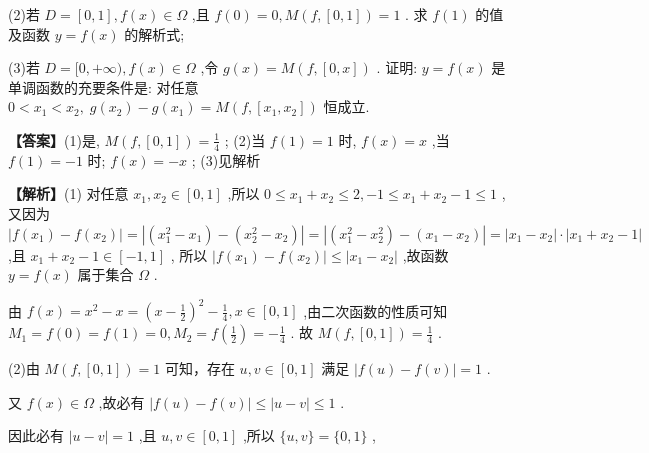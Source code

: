 \documentclass[10pt]{article}
\begin{document}
(2)若 \(D = \left\lbrack  {0,1}\right\rbrack  ,f\left( x\right)  \in  \Omega\) ,且 \(f\left( 0\right)  = 0,M\left( {f,\left\lbrack  {0,1}\right\rbrack  }\right)  = 1\) . 求 \(f\left( 1\right)\) 的值及函数 \(y = f\left( x\right)\) 的解析式;

(3)若 \(D = \lbrack 0, + \infty ),f\left( x\right)  \in  \Omega\) ,令 \(g\left( x\right)  = M\left( {f,\left\lbrack  {0,x}\right\rbrack  }\right)\) . 证明: \(y = f\left( x\right)\) 是单调函数的充要条件是: 对任意 \(0 < {x}_{1} < {x}_{2},\;g\left( {x}_{2}\right)  - g\left( {x}_{1}\right)  = M\left( {f,\left\lbrack  {{x}_{1},{x}_{2}}\right\rbrack  }\right)\) 恒成立.

\textbf{【答案】}(1)是, \(M\left( {f,\left\lbrack  {0,1}\right\rbrack  }\right)  = \frac{1}{4}\) ; (2)当 \(f\left( 1\right)  = 1\) 时, \(f\left( x\right)  = x\) ,当 \(f\left( 1\right)  =  - 1\) 时; \(f\left( x\right)  =  - x\) ; (3)见解析

\textbf{【解析】}(1) 对任意 \({x}_{1},{x}_{2} \in  \left\lbrack  {0,1}\right\rbrack\) ,所以 \(0 \leq  {x}_{1} + {x}_{2} \leq  2, - 1 \leq  {x}_{1} + {x}_{2} - 1 \leq  1\) , 又因为 \(\left| {f\left( {x}_{1}\right)  - f\left( {x}_{2}\right) }\right|  = \left| {\left( {{x}_{1}^{2} - {x}_{1}}\right)  - \left( {{x}_{2}^{2} - {x}_{2}}\right) }\right|  = \left| {\left( {{x}_{1}^{2} - {x}_{2}^{2}}\right)  - \left( {{x}_{1} - {x}_{2}}\right) }\right|  = \left| {{x}_{1} - {x}_{2}}\right|  \cdot  \left| {{x}_{1} + {x}_{2} - 1}\right|\) ,且 \({x}_{1} + {x}_{2} - 1 \in  \left\lbrack  {-1,1}\right\rbrack\) , 所以 \(\left| {f\left( {x}_{1}\right)  - f\left( {x}_{2}\right) }\right|  \leq  \left| {{x}_{1} - {x}_{2}}\right|\) ,故函数 \(y = f\left( x\right)\) 属于集合 \(\Omega\) .

由 \(f\left( x\right)  = {x}^{2} - x = {\left( x - \frac{1}{2}\right) }^{2} - \frac{1}{4}, x \in  \left\lbrack  {0,1}\right\rbrack\) ,由二次函数的性质可知 \({M}_{1} = f\left( 0\right)  = f\left( 1\right)  = 0,{M}_{2} = f\left( \frac{1}{2}\right)  =  - \frac{1}{4}\) . 故 \(M\left( {f,\left\lbrack  {0,1}\right\rbrack  }\right)  = \frac{1}{4}\) .

(2)由 \(M\left( {f,\left\lbrack  {0,1}\right\rbrack  }\right)  = 1\) 可知，存在 \(u, v \in  \left\lbrack  {0,1}\right\rbrack\) 满足 \(\left| {f\left( u\right)  - f\left( v\right) }\right|  = 1\) .

又 \(f\left( x\right)  \in  \Omega\) ,故必有 \(\left| {f\left( u\right)  - f\left( v\right) }\right|  \leq  \left| {u - v}\right|  \leq  1\) .

因此必有 \(\left| {u - v}\right|  = 1\) ,且 \(u, v \in  \left\lbrack  {0,1}\right\rbrack\) ,所以 \(\{ u, v\}  = \{ 0,1\}\) ,
\end{document}
